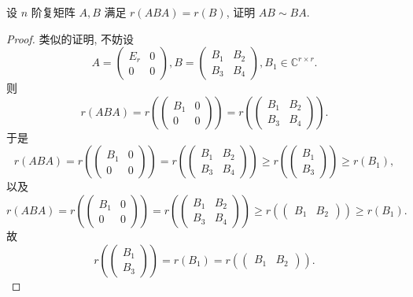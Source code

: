 \documentclass[../../main.tex]{subfiles}%
\begin{document}
\begin{example}
设 \( n \) 阶复矩阵 \( A,B \) 满足 \( r(ABA) = r(B) \), 证明 \( AB \sim BA \).
\end{example}
\begin{proof}

类似的证明, 不妨设
\[
A = \begin{pmatrix} E_r & 0 \\ 0 & 0 \end{pmatrix}, B = \begin{pmatrix} B_1 & B_2 \\ B_3 & B_4 \end{pmatrix}, B_1 \in \mathbb{C}^{r \times r}.
\]
则
\[
r(ABA) = r\left( \begin{pmatrix} B_1 & 0 \\ 0 & 0 \end{pmatrix} \right) = r\left( \begin{pmatrix} B_1 & B_2 \\ B_3 & B_4 \end{pmatrix} \right).
\]
于是
\[
r(ABA) = r\left( \begin{pmatrix} B_1 & 0 \\ 0 & 0 \end{pmatrix} \right) = r\left( \begin{pmatrix} B_1 & B_2 \\ B_3 & B_4 \end{pmatrix} \right) \geqslant r\left( \begin{pmatrix} B_1 \\ B_3 \end{pmatrix} \right) \geqslant r(B_1),
\]
以及
\[
r(ABA) = r\left( \begin{pmatrix} B_1 & 0 \\ 0 & 0 \end{pmatrix} \right) = r\left( \begin{pmatrix} B_1 & B_2 \\ B_3 & B_4 \end{pmatrix} \right) \geqslant r\left( \begin{pmatrix} B_1 & B_2 \end{pmatrix} \right) \geqslant r(B_1).
\]
故
\[
r\left( \begin{pmatrix} B_1 \\ B_3 \end{pmatrix} \right) = r(B_1) = r\left( \begin{pmatrix} B_1 & B_2 \end{pmatrix} \right).
\]
\end{proof}
\end{document}

